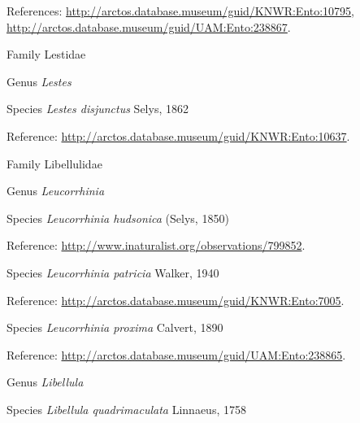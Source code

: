 \documentclass[9pt, article]{memoir}
\begin{document}
\begin{multicols}{2}
\vspace{6pt}References: 
\url{http://arctos.database.museum/guid/KNWR:Ento:10795}, 
\url{http://arctos.database.museum/guid/UAM:Ento:238867}.

\vspace{6pt}\noindent\hspace{24pt}Family Lestidae


\vspace{6pt}\noindent\hspace{30pt}Genus \textit{Lestes}


\vspace{6pt}\noindent\hspace{36pt}Species \textit{Lestes disjunctus} Selys, 1862


\vspace{6pt}Reference: 
\url{http://arctos.database.museum/guid/KNWR:Ento:10637}.

\vspace{6pt}\noindent\hspace{24pt}Family Libellulidae


\vspace{6pt}\noindent\hspace{30pt}Genus \textit{Leucorrhinia}


\vspace{6pt}\noindent\hspace{36pt}Species \textit{Leucorrhinia hudsonica} (Selys, 1850)


\vspace{6pt}Reference: 
\url{http://www.inaturalist.org/observations/799852}.

\vspace{6pt}\noindent\hspace{36pt}Species \textit{Leucorrhinia patricia} Walker, 1940


\vspace{6pt}Reference: 
\url{http://arctos.database.museum/guid/KNWR:Ento:7005}.

\vspace{6pt}\noindent\hspace{36pt}Species \textit{Leucorrhinia proxima} Calvert, 1890


\vspace{6pt}Reference: 
\url{http://arctos.database.museum/guid/UAM:Ento:238865}.

\vspace{6pt}\noindent\hspace{30pt}Genus \textit{Libellula}


\vspace{6pt}\noindent\hspace{36pt}Species \textit{Libellula quadrimaculata} Linnaeus, 1758



\end{multicols}
\end{document}
